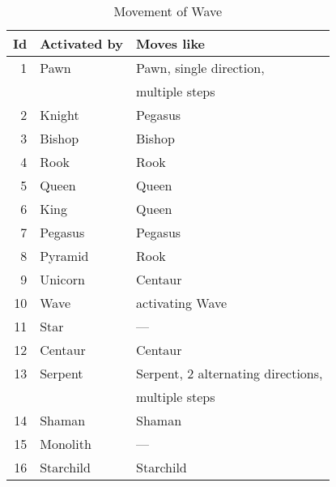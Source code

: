 \begin{table}[!h]
\centering
\begin{tabular}{ rll }
\toprule
\textbf{Id} & \textbf{Activated by} & \textbf{Moves like}                       \\
\midrule
 1          & Pawn                  & Pawn, single direction,                   \\
            &                       & multiple steps                            \\
 2          & Knight                & Pegasus                                   \\
 3          & Bishop                & Bishop                                    \\
 4          & Rook                  & Rook                                      \\
 5          & Queen                 & Queen                                     \\
 6          & King                  & Queen                                     \\ \cmidrule{1-3}
 7          & Pegasus               & Pegasus                                   \\
 8          & Pyramid               & Rook                                      \\
 9          & Unicorn               & Centaur                                   \\
10          & Wave                  & activating Wave                           \\
11          & Star                  & ---                                       \\
12          & Centaur               & Centaur                                   \\
13          & Serpent               & Serpent, 2 alternating directions,        \\
            &                       & multiple steps                            \\
14          & Shaman                & Shaman                                    \\
15          & Monolith              & ---                                       \\
16          & Starchild             & Starchild                                 \\
\bottomrule
\end{tabular}
\caption{Movement of Wave}
\label{tbl:Appendix/Movement of Wave}
\end{table}

